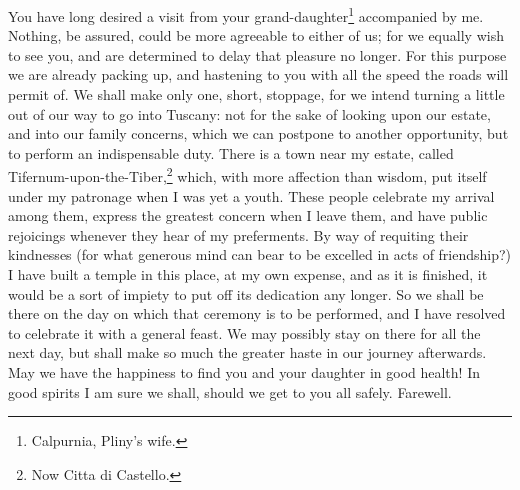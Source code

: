 
You have long desired a visit from your grand-daughter\footnote{Calpurnia, Pliny's wife.}
accompanied by me. Nothing, be assured, could be more agreeable to either
of us; for we equally wish to see you, and are determined to delay that
pleasure no longer. For this purpose we are already packing up, and
hastening to you with all the speed the roads will permit of. We shall
make only one, short, stoppage, for we intend turning a little out of our
way to go into Tuscany: not for the sake of looking upon our estate, and
into our family concerns, which we can postpone to another opportunity,
but to perform an indispensable duty. There is a town near my estate,
called Tifernum-upon-the-Tiber,\footnote{Now Citta di Castello.} which, with more affection than wisdom, put
itself under my patronage when I was yet a youth. These people celebrate
my arrival among them, express the greatest concern when I leave them, and
have public rejoicings whenever they hear of my preferments. By way of
requiting their kindnesses (for what generous mind can bear to be excelled
in acts of friendship?) I have built a temple in this place, at my own
expense, and as it is finished, it would be a sort of impiety to put off
its dedication any longer. So we shall be there on the day on which that
ceremony is to be performed, and I have resolved to celebrate it with a
general feast. We may possibly stay on there for all the next day, but
shall make so much the greater haste in our journey afterwards. May we
have the happiness to find you and your daughter in good health! In good
spirits I am sure we shall, should we get to you all safely. Farewell.



